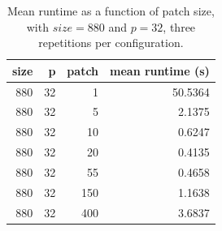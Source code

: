 \begin{table}[htb]
 \centering
\caption{\label{tab:patch_influence}Mean runtime as a function of patch size, with $size = 880$ and $p = 32$, three repetitions per configuration.}
\begin{tabular}{rrrr}
  \toprule
  size & p & patch & mean runtime (s)\\
  \midrule
  880 & 32 & 1 & 50.5364 \\
  880 & 32 & 5 & 2.1375 \\
  880 & 32 & 10 & 0.6247 \\
  880 & 32 & 20 & 0.4135 \\
  880 & 32 & 55 & 0.4658 \\
  880 & 32 & 150 & 1.1638 \\
  880 & 32 & 400 & 3.6837 \\
  \bottomrule
\end{tabular}
\end{table}
